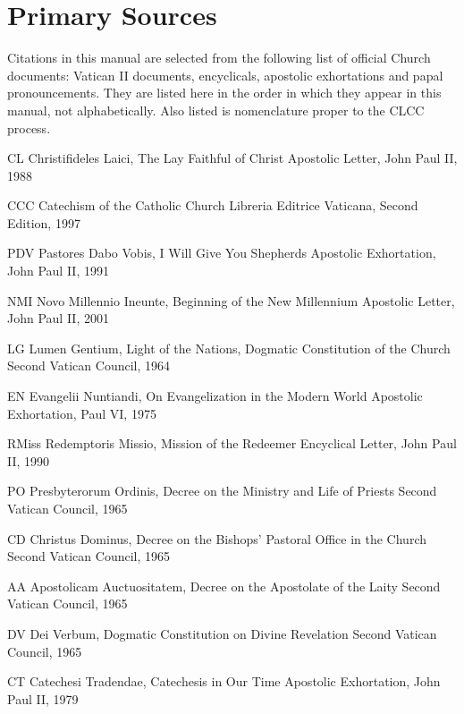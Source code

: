 \documentclass[oneside]{book}
\begin{document}

\pagebreak
\tableofcontents


\chapter{Primary Sources}

Citations in this manual are selected from the following list of official Church
documents: Vatican II documents, encyclicals, apostolic exhortations and papal
pronouncements. They are listed here in the order in which they appear in this
manual, not alphabetically. Also listed is nomenclature proper to the CLCC
process.

CL    Christifideles Laici, The Lay Faithful of Christ
    Apostolic Letter, John Paul II, 1988

CCC    Catechism of the Catholic Church
    Libreria Editrice Vaticana, Second Edition, 1997

PDV    Pastores Dabo Vobis, I Will Give You Shepherds
    Apostolic Exhortation, John Paul II, 1991

NMI    Novo Millennio Ineunte, Beginning of the New Millennium
    Apostolic Letter, John Paul II, 2001

LG    Lumen Gentium, Light of the Nations,
    Dogmatic Constitution of the Church
    Second Vatican Council, 1964

EN    Evangelii Nuntiandi, On Evangelization in the Modern World
    Apostolic Exhortation, Paul VI, 1975

RMiss    Redemptoris Missio, Mission of the Redeemer
    Encyclical Letter, John Paul II, 1990

PO    Presbyterorum Ordinis, Decree on the Ministry and Life of Priests
    Second Vatican Council, 1965

CD    Christus Dominus, Decree on the Bishops' Pastoral Office
      in the Church
    Second Vatican Council, 1965

AA    Apostolicam Auctuositatem, Decree on the Apostolate of the Laity
    Second Vatican Council, 1965


DV    Dei Verbum, Dogmatic Constitution on Divine Revelation
    Second Vatican Council, 1965

CT    Catechesi Tradendae, Catechesis in Our Time
    Apostolic Exhortation, John Paul II, 1979
\end{document}
